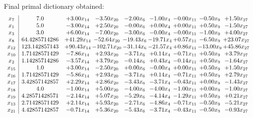 \documentclass[8pt]{article}
\begin{document}
 Final primal dictionary obtained: 
\[\begin{array}{c| c c@{\hskip 2pt} c@{\hskip 2pt} c@{\hskip 2pt} c@{\hskip 2pt} c@{\hskip 2pt} c@{\hskip 2pt} c@{\hskip 2pt} }
 x_{7}   &  7.0 & +  3.00 x_{14} & -3.50 x_{20} & -2.00 x_{6} & -1.00 x_{4} & -0.00 x_{11} & -0.50 x_{9} & +  1.50 x_{27}\\
 x_{1}   &  5.0 & -3.00 x_{14} & +  2.50 x_{20} & -0.00 x_{6} & +  0.00 x_{4} & +  0.00 x_{11} & +  0.50 x_{9} & -1.50 x_{27}\\
 x_{3}   &  3.0 & +  6.00 x_{14} & -7.00 x_{20} & -3.00 x_{6} & -0.00 x_{4} & -0.00 x_{11} & -1.00 x_{9} & +  4.00 x_{27}\\
 x_{8}   &  64.4285714286 & + 41.29 x_{14} & -52.64 x_{20} & -19.43 x_{6} & -19.71 x_{4} & +  0.57 x_{11} & -6.50 x_{9} & + 23.07 x_{27}\\
 x_{12}   &  123.142857143 & + 90.43 x_{14} & -102.71 x_{20} & -31.14 x_{6} & -21.57 x_{4} & +  0.86 x_{11} & -13.00 x_{9} & + 45.86 x_{27}\\
 x_{10}   &  1.71428571429 & -7.86 x_{14} & +  2.93 x_{20} & -3.71 x_{6} & +  0.14 x_{4} & -0.71 x_{11} & +  0.50 x_{9} & +  3.79 x_{27}\\
 x_{2}   &  1.14285714286 & -3.57 x_{14} & +  3.79 x_{20} & -0.14 x_{6} & +  0.43 x_{4} & -0.14 x_{11} & +  0.50 x_{9} & -1.64 x_{27}\\
 x_{15}   &  1.0 & +  3.00 x_{14} & -2.50 x_{20} & +  0.00 x_{6} & -0.00 x_{4} & +  0.00 x_{11} & +  0.50 x_{9} & +  1.50 x_{27}\\
 x_{16}   &  1.71428571429 & -5.86 x_{14} & +  2.93 x_{20} & -3.71 x_{6} & +  0.14 x_{4} & -0.71 x_{11} & +  0.50 x_{9} & +  2.79 x_{27}\\
 x_{17}   &  3.42857142857 & +  2.29 x_{14} & +  2.86 x_{20} & -3.43 x_{6} & -3.71 x_{4} & -0.43 x_{11} & +  0.00 x_{9} & -1.43 x_{27}\\
 x_{18}   &  4.0 & -1.00 x_{14} & +  5.00 x_{20} & -4.00 x_{6} & -4.00 x_{4} & -1.00 x_{11} & +  0.00 x_{9} & -1.00 x_{27}\\
 x_{19}   &  4.28571428571 & -2.14 x_{14} & +  5.07 x_{20} & -5.29 x_{6} & -4.14 x_{4} & -1.29 x_{11} & +  0.50 x_{9} & +  0.21 x_{27}\\
 x_{13}   &  2.71428571429 & +  2.14 x_{14} & +  5.93 x_{20} & -2.71 x_{6} & -4.86 x_{4} & -0.71 x_{11} & -0.50 x_{9} & -5.21 x_{27}\\
 x_{21}   &  4.42857142857 & -0.71 x_{14} & +  5.36 x_{20} & -5.43 x_{6} & -3.71 x_{4} & -0.43 x_{11} & -0.50 x_{9} & -0.93 x_{27}\\

\end{array}\]
\end{document}

